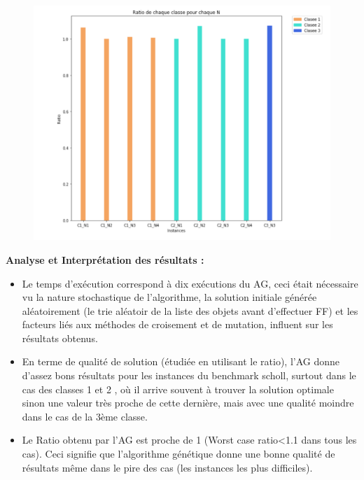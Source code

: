 \documentclass{article}
\begin{document}
\begin{figure}[H]
  \includegraphics[width=\linewidth]{../figures/pic11.PNG}
\end{figure}
\textbf{Analyse et Interprétation des résultats : }
\newline
\begin{itemize}
	\item Le temps d’exécution correspond à dix exécutions du AG, ceci était nécessaire vu la nature stochastique de l’algorithme,  la solution initiale générée aléatoirement (le trie aléatoir de la liste des objets avant d’effectuer FF) et les facteurs liés aux méthodes de croisement et de mutation, influent sur les résultats obtenus.
	\item En terme de qualité de solution (étudiée en utilisant le ratio), l'AG donne d’assez bons résultats pour les instances du benchmark scholl, surtout dans le cas des classes 1 et 2 , où il arrive souvent à trouver la solution optimale sinon une valeur très proche de cette dernière, mais avec une qualité moindre dans le cas de la 3ème classe. 
	\item Le Ratio obtenu par l’AG est proche de 1 (Worst case ratio<1.1 dans tous les cas). Ceci signifie que l’algorithme génétique donne une bonne qualité de résultats même dans le pire des cas (les instances les plus difficiles).
\end{itemize}
\end{document}
